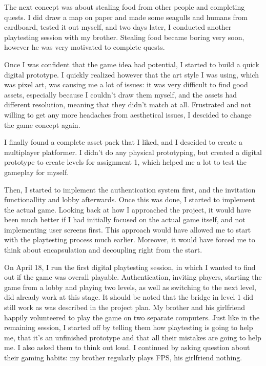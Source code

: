 \documentclass{article}
\begin{document}
\bigskip
The next concept was about stealing food from other people and completing quests. I did draw a map on paper and made some seagulls and humans from cardboard, tested it out myself, and two days later, I conducted another playtesting session with my brother. Stealing food became boring very soon, however he was very motivated to complete quests. 

Once I was confident that the game idea had potential, I started to build a quick digital prototype. I quickly realized however that the art style I was using, which was pixel art, was causing me a lot of issues: it was very difficult to find good assets, especially because I couldn't draw them myself, and the assets had different resolution, meaning that they didn't match at all. Frustrated and not willing to get any more headaches from aesthetical issues, I descided to change the game concept again.

\bigskip
I finally found a complete asset pack that I liked, and I descided to create a multiplayer platformer. I didn't do any physical prototyping, but created a digital prototype to create levels for assignment 1, which helped me a lot to test the gameplay for myself. 

Then, I started to implement the authentication system first, and the invitation functionallity and lobby afterwards. Once this was done, I started to implement the actual game. 
Looking back at how I approached the project, it would have been much better if I had initially focused on the actual game itself, and not implementing user screens first. This approach would have allowed me to start with the playtesting process much earlier. Moreover, it would have forced me to think about encapsulation and decoupling right from the start. 

\bigskip
On April 18, I run the first digital playtesting session, in which I wanted to find out if the game was overall playable. Authentication, inviting players, starting the game from a lobby and playing two levels, as well as switching to the next level, did already work at this stage. It should be noted that the bridge in level 1 did still work as was described in the project plan. My brother and his girlfriend happily volunteered to play the game on two separate computers. Just like in the remaining session, I started off by telling them how playtesting is going to help me, that it's an unfinished prototype and that all their mistakes are going to help me. I also asked them to think out loud.
I continued by asking question about their gaming habits: my brother regularly plays FPS, his girlfriend nothing. 
\end{document}
